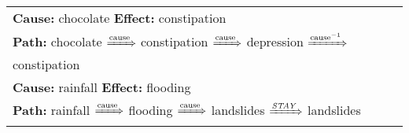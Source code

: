 \begin{table}
\begin{tabular}{m{13cm} m{0.2cm}}
  \midrule
   \vspace{0.2cm}
  \textbf{Cause:} chocolate \hspace{0.39cm} \textbf{Effect:} constipation &\\ 
   \vspace{0.2cm}
  \textbf{Path:} chocolate $\xRightarrow{\text{cause}}$ constipation $\xRightarrow{\text{cause}}$ depression $\xRightarrow{\text{cause}^{-1}}$ constipation \vspace{0.2cm}\\
  \midrule
   \vspace{0.2cm}
  \textbf{Cause:} rainfall \hspace{0.80cm} \textbf{Effect:} flooding &\\ 
   \vspace{0.2cm}
  \textbf{Path:} rainfall $\xRightarrow{\text{cause}}$ flooding $\xRightarrow{\text{cause}}$ landslides $\xRightarrow{\text{\textit{STAY}}}$ landslides \vspace{0.2cm}\\
  \bottomrule
\end{tabular}
\end{table}
